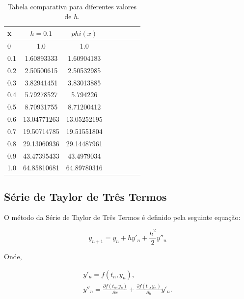 \documentclass[a4paper]{article}
\begin{document}
\begin{table}[!h]
\centering
\begin{tabular}{l*{6}{c}r}
x               & $h=0.1$ & $phi(x)$ \\
\hline
0                   & 1.0 & 1.0          \\
0.1                 & 1.60893333 & 1.60904183   \\
0.2                 & 2.50500615 & 2.50532985   \\
0.3                 & 3.82941451 & 3.83013885   \\
0.4                 & 5.79278527 & 5.794226     \\
0.5                 & 8.70931755 & 8.71200412   \\
0.6                 & 13.04771263 & 13.05252195  \\
0.7                 & 19.50714785 & 19.51551804  \\
0.8                 & 29.13060936 & 29.14487961  \\
0.9                 & 43.47395433 & 43.4979034   \\
1.0                 & 64.85810681 & 64.89780316  \\
\end{tabular}
\caption{\label{tab:rkutta}Tabela comparativa para diferentes valores de $h$.}
\end{table}

\pagebreak



\subsection{Série de Taylor de Três Termos}

O método da Série de Taylor de Três Termos é definido pela seguinte equação:

\begin{equation}
\label{eq:taylor}
y_{n+1} = y_{n} + hy'_{n} + \frac{h^2}{2}y''_{n}
\end{equation}

Onde,

\begin{subequations}
\begin{align}
y'_{n} = f(t_n, y_n),
\\
y''_{n} = \tfrac{{\partial f(t_n, y_n)}}{{\partial x}} + \tfrac{{\partial f(t_n, y_n)}}{{\partial y}}y'_{n}.
\end{align}
\end{subequations}
\end{document}
